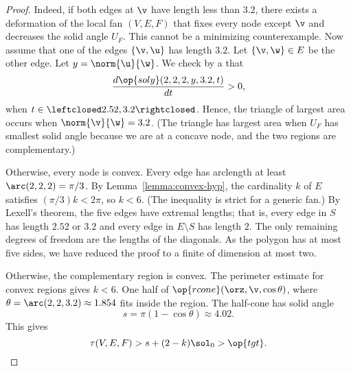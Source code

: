 \begin{proof}
  Indeed,%
 if both edges at $\v$ have length less than $3.2$, there
exists a deformation of the local fan $(V,E,F)$ that fixes every node
except $\v$ and decreases the solid angle $U_F$.  This cannot be a
minimizing counterexample.  Now assume that one of the edges
$\{\v,\u\}$ has length $3.2$.  Let $\{\v,\w\}\in E$ be the other edge.
Let
$y=\norm{\u}{\w}$.  We check by a  that
\[
\dfrac{d\op{soly}(2,2,2,y,3.2,t)}{dt} >0,
\]
when $t\in\leftclosed2.52,3.2\rightclosed$.  Hence, the triangle of
largest area occurs when $\norm{\v}{\w}=3.2$.  (The triangle has
largest area when $U_F$ has smallest solid angle because we are at a
concave node, and the two regions are complementary.)


  Otherwise,
every node is convex.  Every edge has arclength at least
$\arc(2,2,2)=\pi/3$.  By Lemma~\ref{lemma:convex-hyp}, the cardinality
$k$ of $E$ satisfies $(\pi/3)k < 2\pi$, so $k<6$.  (The inequality is
strict for a generic fan.)  By Lexell's theorem, the five edges have
extremal lengths;  that is, every edge in $S$ has length $2.52$ or
$3.2$ and every edge in $E\setminus S$ has length $2$.  The only
remaining degrees of freedom are the lengths of the diagonals.  As the
polygon has at most five sides, we have reduced the proof  to a
finite  of dimension at
most two.


  Otherwise,
the complementary region is convex.  The perimeter estimate for convex
regions gives $k<6$.
One
half of $\op{rcone}(\orz,\v,\cos\theta)$, where
$\theta=\arc(2,2,3.2)\approx 1.854$ fits inside the region.  The
half-cone has solid angle
\[
s=\pi(1-\cos\theta)\approx 4.02.
\]
This gives
\[
\tau(V,E,F) > s + (2-k)\sol_0 > \op{tgt}.
\]
%




\end{proof}
